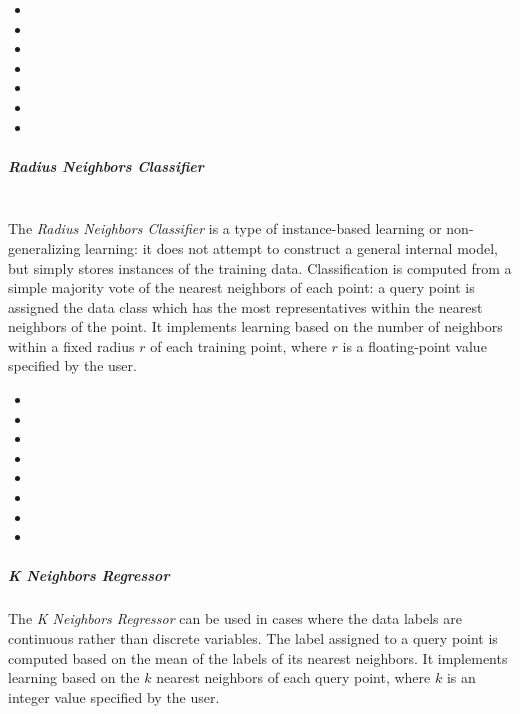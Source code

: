 \begin{itemize}
  \item {}
  \item {}
  \item {}
  \item {}
  \item {}
  \item {}
  \item {}
\end{itemize}
\subparagraph{Radius Neighbors Classifier}
\mbox{}
\\The \textit{Radius Neighbors Classifier} is a type of instance-based learning
or non-generalizing learning: it does not attempt to construct a general
internal model, but simply stores instances of the training data.
%
Classification is computed from a simple majority vote of the nearest neighbors
of each point: a query point is assigned the data class which has the most
representatives within the nearest neighbors of the point.
%
It implements learning based on the number of neighbors within a fixed radius
$r$ of each training point, where $r$ is a floating-point value specified by the
user.

\begin{itemize}
  \item {}
  \item {}
  \item {}
  \item {}
  \item {}
  \item {}
  \item {}
  \item {}
\end{itemize}

\subparagraph{K Neighbors Regressor}
\mbox{}

The \textit{K Neighbors Regressor} can be used in cases where the data labels
are continuous rather than discrete variables.
%
The label assigned to a query point is computed based on the mean of the labels
of its nearest neighbors.
%
It implements learning based on the $k$ nearest neighbors of each query point,
where $k$ is an integer value specified by the user.


